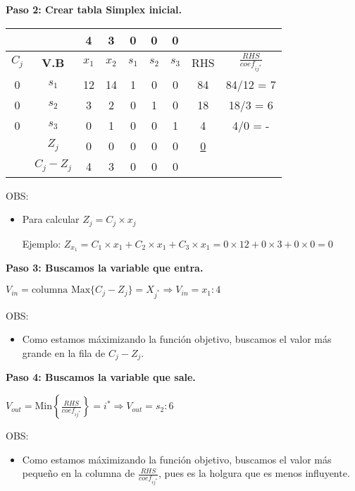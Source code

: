 \documentclass{templateNote}
\begin{document}
\textbf{Paso 2: Crear tabla Simplex inicial.}
\begin{center}
    \begin{tabular}{|c|c|c|c|c|c|c|c|c|}
        \hline
        & & 4 & 3 & 0 & 0 & 0 &  &  \\ \hline
        $C_j$ & \textbf{V.B} & $x_1$ & $x_2$ & $s_1$ & $s_2$ & $s_3$ & RHS & $\displaystyle\frac{RHS}{coef_{ij^*}}$ \\ \hline
        0 & $s_1$ & 12 & 14 & 1 & 0 & 0 & 84 & 84/12 = 7 \\ \hline
        0 & $s_2$ & 3 & 2 & 0 & 1 & 0 & 18 & 18/3 = 6 \\ \hline
        0 & $s_3$ & 0 & 1 & 0 & 0 & 1 & 4 & 4/0 = - \\ \hline
        & $Z_j$ & 0 & 0 & 0 & 0 & 0 & \underline{0} &  \\ \hline
        & $C_j - Z_j$ & 4 & 3 & 0 & 0 & 0 &  &  \\ \hline
    \end{tabular}
\end{center}
OBS:
\begin{itemize}
    \item Para calcular $Z_j = C_j \times x_j $
    \begin{center}
        Ejemplo: $Z_{x_1} = C_1 \times x_1 + C_2 \times x_1 + C_3 \times x_1 = 0 \times 12 + 0 \times 3 + 0 \times 0 = 0$
    \end{center}
\end{itemize}

\textbf{Paso 3: Buscamos la variable que entra.}
\begin{center}
    $V_{in} = \text{columna Max} \{C_j-Z_j\} = X_{j^*} \Rightarrow V_{in} = x_1 : 4$
\end{center}
OBS:
\begin{itemize}
    \item Como estamos máximizando la función objetivo, buscamos el valor más grande en la fila de $C_j - Z_j$.
\end{itemize}

\newpage
\textbf{Paso 4: Buscamos la variable que sale.}
\begin{center}
    $V_{out} = \text{Min} \left\{ \frac{RHS}{coef_{ij^*}} \right\} = i^* \Rightarrow V_{out} = s_2 : 6$
\end{center}
OBS:
\begin{itemize}
    \item Como estamos máximizando la función objetivo, buscamos el valor más pequeño en la columna de $\displaystyle\frac{RHS}{coef_{ij^*}}$, pues es la holgura que es menos influyente.
\end{itemize}
\end{document}
